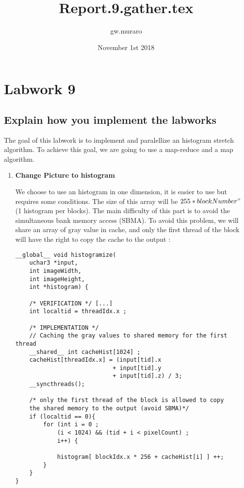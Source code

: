 \documentclass{article}
\title{Report.9.gather.tex}
\author{gw.muraro}
\date{November 1st 2018}
\begin{document}
\maketitle
\section{Labwork 9}

\subsection{Explain how you implement the labworks}

    The goal of this labwork is to implement and paralellize an histogram stretch algorithm. To achieve this goal, we are going to use a map-reduce and a map algorithm. 

    \begin{enumerate}     

    \item \textbf{Change Picture to histogram}
    
    We choose to use an histogram in one dimension, it is easier to use but requires some conditions. The size of this array will be $255 * blockNumber"$ (1 histogram per blocks). The main difficulty of this part is to avoid the simultaneous bank memory access (SBMA). To avoid this problem, we will share an array of gray value in cache, and only the first thread of the block will have the right to copy the cache to the output : 
    
    \begin{verbatim}
__global__ void histogramize(
    uchar3 *input, 
    int imageWidth, 
    int imageHeight, 
    int *histogram) {
    
    /* VERIFICATION */ [...]
    int localtid = threadIdx.x ;
    
    /* IMPLEMENTATION */    
    // Caching the gray values to shared memory for the first thread 
    __shared__ int cacheHist[1024] ;	
    cacheHist[threadIdx.x] = (input[tid].x 
                            + input[tid].y 
                            + input[tid].z) / 3;
    __syncthreads();
    	
    /* only the first thread of the block is allowed to copy 
    the shared memory to the output (avoid SBMA)*/
    if (localtid == 0){
        for (int i = 0 ; 
            (i < 1024) && (tid + i < pixelCount) ; 
            i++) {
            
            histogram[ blockIdx.x * 256 + cacheHist[i] ] ++;
        }
    }
}
    \end{verbatim}
    

\end{enumerate}
\end{document}
